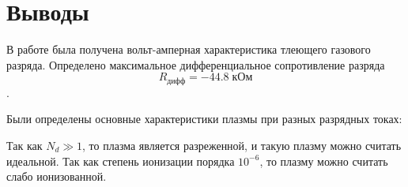 \section*{Выводы}

В работе была получена вольт-амперная характеристика тлеющего газового разряда. Определено максимальное дифференциальное сопротивление разряда 
$$R_{дифф} = -44.8 \; кОм$$.

Были определены основные характеристики плазмы при разных разрядных токах:

\begin{table}[H]
	\centering
	\footnotesize
	
\end{table}

Так как $N_d \gg 1$, то плазма является разреженной, и такую плазму можно считать идеальной. Так как степень ионизации порядка $10^{-6}$, то плазму можно считать слабо ионизованной.